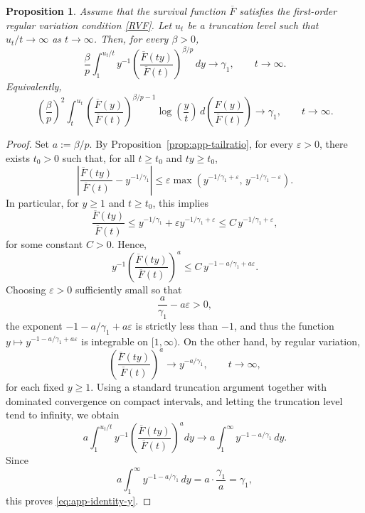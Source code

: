 \documentclass[reqno,openbib,runningheads,a4paper,12pt]{amsart}%
\newtheorem{proposition}{Proposition}[section]
\begin{document}
\begin{proposition}
\label{prop:app-identity} Assume that the survival function $\overline{F}$
satisfies the first-order regular variation condition \eqref{RVF}. Let $u_{t}$
be a truncation level such that $u_{t}/t \to\infty$ as $t \to\infty$. Then,
for every $\beta>0$,
\begin{equation}
\frac{\beta}{p} \int_{1}^{u_{t}/t} y^{-1} \left(  \frac{\overline{F}%
(ty)}{\overline{F}(t)} \right)  ^{\beta/p} \,dy \longrightarrow\gamma_{1},
\qquad t \to\infty. \label{eq:app-identity-y}%
\end{equation}
Equivalently,
\begin{equation}
\left(  \frac{\beta}{p}\right)  ^{2} \int_{t}^{u_{t}} \left(  \frac
{\overline{F}(y)}{\overline{F}(t)} \right)  ^{\beta/p-1} \log\!\left(
\frac{y}{t}\right)  \,d\!\left(  \frac{F(y)}{\overline{F}(t)} \right)
\longrightarrow\gamma_{1}, \qquad t \to\infty. \label{eq:app-identity-t}%
\end{equation}

\end{proposition}

\begin{proof}
Set $a:=\beta/p.$ By Proposition~\ref{prop:app-tailratio}, for every
$\varepsilon>0$, there exists $t_{0}>0$ such that, for all $t\geq t_{0}$ and
$ty\geq t_{0}$,
\[
\left\vert \frac{\overline{F}(ty)}{\overline{F}(t)}-y^{-1/\gamma_{1}%
}\right\vert \leq\varepsilon\max\left(  y^{-1/\gamma_{1}+\varepsilon
},\,y^{-1/\gamma_{1}-\varepsilon}\right)  .
\]
In particular, for $y\geq1$ and $t\geq t_{0}$, this implies
\[
\frac{\overline{F}(ty)}{\overline{F}(t)}\leq y^{-1/\gamma_{1}}+\varepsilon
y^{-1/\gamma_{1}+\varepsilon}\leq C\,y^{-1/\gamma_{1}+\varepsilon},
\]
for some constant $C>0$. Hence,
\[
y^{-1}\left(  \frac{\overline{F}(ty)}{\overline{F}(t)}\right)  ^{a}\leq
C\,y^{-1-a/\gamma_{1}+a\varepsilon}.
\]
Choosing $\varepsilon>0$ sufficiently small so that
\[
\frac{a}{\gamma_{1}}-a\varepsilon>0,
\]
the exponent $-1-a/\gamma_{1}+a\varepsilon$ is strictly less than $-1$, and
thus the function $y\mapsto y^{-1-a/\gamma_{1}+a\varepsilon}$ is integrable on
$[1,\infty)$. On the other hand, by regular variation,
\[
\left(  \frac{\overline{F}(ty)}{\overline{F}(t)}\right)  ^{a}\longrightarrow
y^{-a/\gamma_{1}},\qquad t\rightarrow\infty,
\]
for each fixed $y\geq1$. Using a standard truncation argument together with
dominated convergence on compact intervals, and letting the truncation level
tend to infinity, we obtain
\[
a\int_{1}^{u_{t}/t}y^{-1}\left(  \frac{\overline{F}(ty)}{\overline{F}%
(t)}\right)  ^{a}dy\longrightarrow a\int_{1}^{\infty}y^{-1-a/\gamma_{1}}\,dy.
\]
Since
\[
a\int_{1}^{\infty}y^{-1-a/\gamma_{1}}\,dy=a\cdot\frac{\gamma_{1}}{a}%
=\gamma_{1},
\]
this proves \eqref{eq:app-identity-y}.\smallskip
\end{proof}
\end{document}
